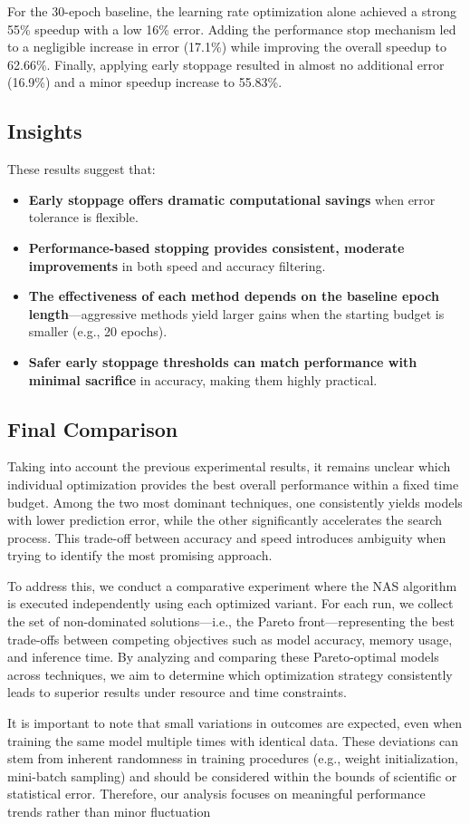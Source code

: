 For the 30-epoch baseline, the learning rate optimization alone achieved a strong 55\% speedup with a low 16\% error. Adding the performance stop mechanism led to a negligible increase in error (17.1\%) while improving the overall speedup to 62.66\%. Finally, applying early stoppage resulted in almost no additional error (16.9\%) and a minor speedup increase to 55.83\%.

\subsection*{Insights}

These results suggest that:
\begin{itemize}
    \item \textbf{Early stoppage offers dramatic computational savings} when error tolerance is flexible.
    \item \textbf{Performance-based stopping provides consistent, moderate improvements} in both speed and accuracy filtering.
    \item \textbf{The effectiveness of each method depends on the baseline epoch length}—aggressive methods yield larger gains when the starting budget is smaller (e.g., 20 epochs).
    \item \textbf{Safer early stoppage thresholds can match performance with minimal sacrifice} in accuracy, making them highly practical.
\end{itemize}


\subsection{Final Comparison}

Taking into account the previous experimental results, it remains unclear which individual optimization provides the best overall performance within a fixed time budget. Among the two most dominant techniques, one consistently yields models with lower prediction error, while the other significantly accelerates the search process. This trade-off between accuracy and speed introduces ambiguity when trying to identify the most promising approach.

To address this, we conduct a comparative experiment where the NAS algorithm is executed independently using each optimized variant. For each run, we collect the set of non-dominated solutions—i.e., the Pareto front—representing the best trade-offs between competing objectives such as model accuracy, memory usage, and inference time. By analyzing and comparing these Pareto-optimal models across techniques, we aim to determine which optimization strategy consistently leads to superior results under resource and time constraints.

It is important to note that small variations in outcomes are expected, even when training the same model multiple times with identical data. These deviations can stem from inherent randomness in training procedures (e.g., weight initialization, mini-batch sampling) and should be considered within the bounds of scientific or statistical error. Therefore, our analysis focuses on meaningful performance trends rather than minor fluctuation